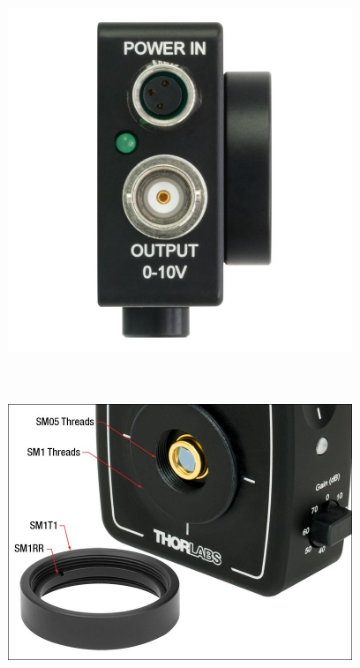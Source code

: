 \begin{figure}[!htbp]
	\centering
	\begin{subfigure}[c]{0.5\textwidth}
		\includegraphics[width=\textwidth]{./Img/PDA20CSTOP.jpg}
		\caption{}
		\label{fig:PDA20CS-EC-IMG}
	\end{subfigure}%
	~%
	\begin{subfigure}[c]{0.5\textwidth}
		\includegraphics[width=\textwidth]{./Img/PDA20CFRONT.jpg}
		\caption{}
		\label{fig:PDA20CS-EC-PICTURE}
	\end{subfigure}
	
	\label{fig:PDA20CSTOPANDFRONT}
\end{figure}

